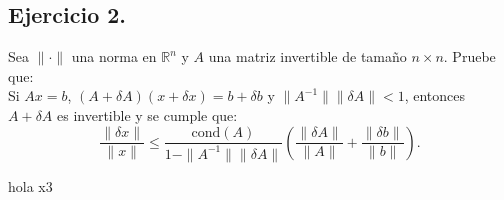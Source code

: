
\subsection*{Ejercicio 2.}
Sea $\| \cdot \|$ una norma en $\mathbb{R}^n$ y $A$ una matriz invertible de tamaño $n \times n$. Pruebe que:\\

Si $Ax = b$, $(A + \delta A)(x + \delta x) = b + \delta b$ y $\|A^{-1}\| \|\delta A\| < 1$, entonces $A + \delta A$ es invertible y se cumple que:
\[
\frac{\|\delta x\|}{\|x\|} \leq \frac{\text{cond}(A)}{1 - \|A^{-1}\| \|\delta A\|} \left( \frac{\|\delta A\|}{\|A\|} + \frac{\|\delta b\|}{\|b\|} \right).
\]

\begin{sproof}
    hola x3
\end{sproof}